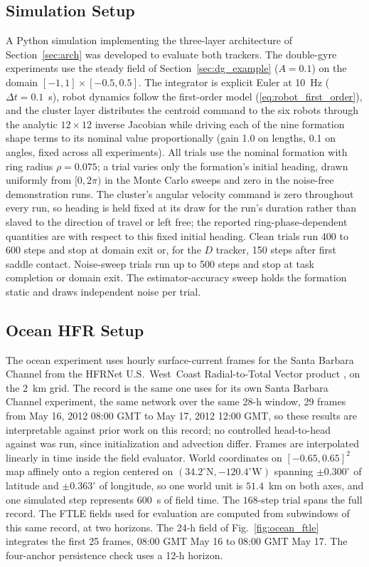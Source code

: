 \documentclass[lettersize,journal]{IEEEtran}
\begin{document}
\subsection{Simulation Setup}
\label{sec:sim_setup}

A Python simulation implementing the three-layer architecture of
Section~\ref{sec:arch} was developed to evaluate both trackers.
The double-gyre experiments use the steady field of
Section~\ref{sec:dg_example} ($A = 0.1$) on the domain $[-1, 1] \times
[-0.5, 0.5]$. The integrator is explicit Euler at 10~Hz ($\Delta t =
0.1$~s), robot dynamics follow the first-order model
(\ref{eq:robot_first_order}), and the cluster layer distributes the centroid
command to the six robots through the analytic $12 \times 12$ inverse
Jacobian while driving each of the nine formation shape terms to its
nominal value proportionally (gain 1.0 on lengths, 0.1 on angles, fixed
across all experiments). All trials use the nominal formation with ring
radius $\rho = 0.075$; a trial varies only the formation's initial
heading, drawn uniformly from $[0, 2\pi)$ in the Monte Carlo sweeps and
zero in the noise-free demonstration runs. The cluster's angular
velocity command is zero throughout every run, so heading is held fixed
at its draw for the run's duration rather than slaved to the direction
of travel or left free; the reported ring-phase-dependent quantities
are with respect to this fixed initial
heading. Clean trials run 400 to 600
steps and stop at domain exit or, for the $D$ tracker, 150 steps after
first saddle contact. Noise-sweep trials run up to 500 steps and stop
at task completion or domain exit. The estimator-accuracy sweep holds
the formation static and draws independent noise per trial. 


\subsection{Ocean HFR Setup}
\label{sec:ocean_sim}

The ocean experiment uses hourly surface-current frames for the Santa
Barbara Channel from the HFRNet U.S.~West~Coast Radial-to-Total Vector
product \cite{40}, on the $2$~km grid. The record is the same one
\cite{17} uses for its own Santa Barbara Channel experiment, the same
network over the same 28-h window, 29 frames from May 16, 2012 08:00
GMT to May 17, 2012 12:00 GMT, so these results are interpretable
against prior work on this record; no controlled head-to-head against
\cite{17} was run, since initialization and advection differ. Frames are interpolated linearly in time
inside the field evaluator. World coordinates on $[-0.65, 0.65]^2$ map
affinely onto a region centered on
$(34.2^{\circ}\mathrm{N}, -120.4^{\circ}\mathrm{W})$ spanning
$\pm 0.300^{\circ}$ of latitude and $\pm 0.363^{\circ}$ of longitude, so one world
unit is $51.4$~km on both axes, and one simulated
step represents $600$~s of field time. The $168$-step trial spans the
full record. The FTLE fields used for evaluation are computed from
subwindows of this same record, at two horizons. The 24-h field of
Fig.~\ref{fig:ocean_ftle} integrates the first 25 frames, 08:00 GMT
May 16 to 08:00 GMT May 17. The four-anchor persistence check
uses a 12-h horizon.
\end{document}
